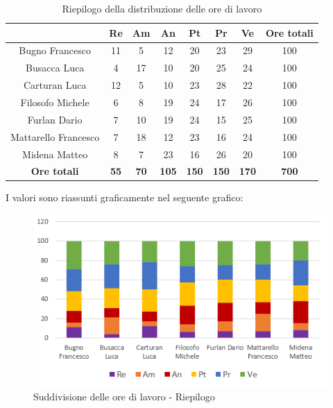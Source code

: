  \begin{table}[H]
   \centering
    \renewcommand{\arraystretch}{1.8}
     \begin{tabular}{c|c|c|c|c|c|c|c}
      \rowcolor[HTML]{125E28} 
       \multicolumn{1}{c}{\color[HTML]{FFFFFF}\textbf{ Nominativo }}
         & \multicolumn{1}{c}{\color[HTML]{FFFFFF}\textbf{ Re }}
         & \multicolumn{1}{c}{\color[HTML]{FFFFFF}\textbf{ Am}}
         & \multicolumn{1}{c}{\color[HTML]{FFFFFF}\textbf{ An }}
         & \multicolumn{1}{c}{\color[HTML]{FFFFFF}\textbf{ Pt }}
         & \multicolumn{1}{c}{\color[HTML]{FFFFFF}\textbf{ Pr }}
         & \multicolumn{1}{c}{\color[HTML]{FFFFFF}\textbf{ Ve }}
         & \multicolumn{1}{c}{\color[HTML]{FFFFFF}\textbf{ Ore totali }}\\
         \hline
         Bugno Francesco        & 11 & 5 & 12 & 20 & 23 & 29 & 100\\
         Busacca Luca           & 4 & 17 & 10 & 20 & 25 & 24 & 100\\
         Carturan Luca          & 12 & 5 & 10 & 23 & 28 & 22 & 100\\
         Filosofo Michele       & 6 & 8 & 19 & 24 & 17 & 26 & 100\\
         Furlan Dario           & 7 & 10 & 19 & 24 & 15 & 25 & 100\\
         Mattarello Francesco   & 7 & 18 & 12 & 23 & 16 & 24 & 100\\
         Midena Matteo          & 8 & 7 & 23 & 16 & 26 & 20 & 100\\
         \textbf{Ore totali} & \textbf{55} & \textbf{70} & \textbf{105} & \textbf{150} & \textbf{150} & \textbf{170} & \textbf{700}
       \end{tabular}
       \caption{Riepilogo della distribuzione delle ore di lavoro}
     \end{table}
   
   I valori sono riassunti graficamente nel seguente grafico:
   
   \begin{figure}[H]
       \centering
        \includegraphics[scale=1.2]{immagini/ore_lavoro_riepilogo.png}
        \caption{Suddivisione delle ore di lavoro - Riepilogo}
      \end{figure}
   
